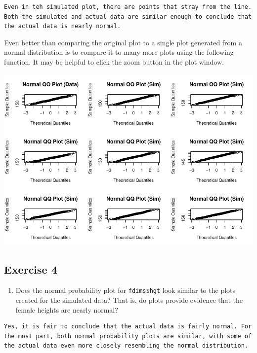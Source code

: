 \documentclass[]{article}
\newenvironment{Shaded}{\begin{snugshade}}{\end{snugshade}}
\newcommand{\KeywordTok}[1]{\textcolor[rgb]{0.13,0.29,0.53}{\textbf{{#1}}}}
\newcommand{\NormalTok}[1]{{#1}}
\providecommand{\tightlist}{%
  \setlength{\itemsep}{0pt}\setlength{\parskip}{0pt}}
\begin{document}
\begin{verbatim}
Even in teh simulated plot, there are points that stray from the line. Both the simulated and actual data are similar enough to conclude that the actual data is nearly normal.
\end{verbatim}

Even better than comparing the original plot to a single plot generated
from a normal distribution is to compare it to many more plots using the
following function. It may be helpful to click the zoom button in the
plot window.

\begin{Shaded}
\end{Shaded}

\includegraphics{Lab_3_files/figure-latex/qqnormsim-1.pdf}

\subsection{Exercise 4}\label{exercise-4}

\begin{enumerate}
\def\labelenumi{\arabic{enumi}.}
\setcounter{enumi}{3}
\tightlist
\item
  Does the normal probability plot for \texttt{fdims\$hgt} look similar
  to the plots created for the simulated data? That is, do plots provide
  evidence that the female heights are nearly normal?
\end{enumerate}

\begin{verbatim}
Yes, it is fair to conclude that the actual data is fairly normal. For the most part, both normal probability plots are similar, with some of the actual data even more closely resembling the normal distribution.
\end{verbatim}
\end{document}
